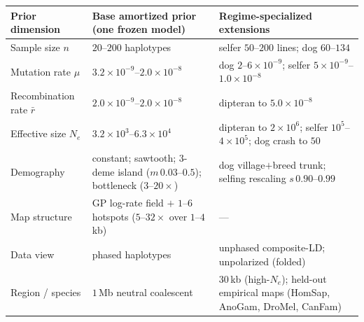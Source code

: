 \footnotesize
\begin{tabular}{@{}p{2.15cm}p{5.5cm}p{6.7cm}@{}}
\toprule
Prior dimension & Base amortized prior (one frozen model) & Regime-specialized extensions \\
\midrule
Sample size $n$ & $20$--$200$ haplotypes & selfer $50$--$200$ lines; dog $60$--$134$ \\
Mutation rate $\mu$ & $3.2\times10^{-9}$--$2.0\times10^{-8}$ & dog $2$--$6\times10^{-9}$; selfer $5\times10^{-9}$--$1.0\times10^{-8}$ \\
Recombination rate $\bar r$ & $2.0\times10^{-9}$--$2.0\times10^{-8}$ & dipteran to $5.0\times10^{-8}$ \\
Effective size $N_e$ & $3.2\times10^{3}$--$6.3\times10^{4}$ & dipteran to $2\times10^{6}$; selfer $10^{5}$--$4\times10^{5}$; dog crash to $50$ \\
Demography & constant; sawtooth; $3$-deme island ($m\,0.03$--$0.5$); bottleneck ($3$--$20\times$) & dog village$+$breed trunk; selfing rescaling $s\,0.90$--$0.99$ \\
Map structure & GP log-rate field $+$ $1$--$6$ hotspots ($5$--$32\times$ over $1$--$4$\,kb) & --- \\
Data view & phased haplotypes & unphased composite-LD; unpolarized (folded) \\
Region / species & $1$\,Mb neutral coalescent & $30$\,kb (high-$N_e$); held-out empirical maps (HomSap, AnoGam, DroMel, CanFam) \\
\bottomrule
\end{tabular}
